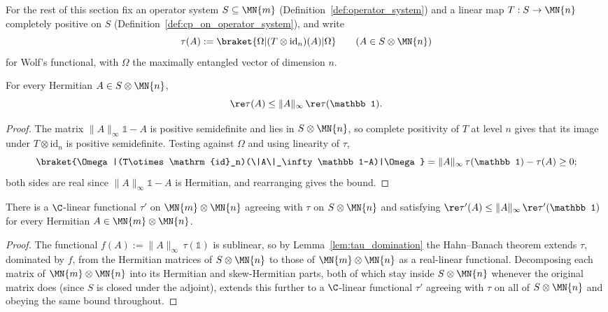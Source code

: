 For the rest of this section fix an operator system $S\subseteq\MN{m}$
(Definition~\ref{def:operator_system}) and a linear map $T:S\to\MN{n}$
completely positive on $S$ (Definition~\ref{def:cp_on_operator_system}),
and write
\[
    \tau(A):=\braket{\Omega|(T\otimes\mathrm{id}_n)(A)|\Omega}
    \qquad(A\in S\otimes\MN{n})
\]
for Wolf's functional, with $\Omega$ the maximally entangled vector of
dimension $n$.

\begin{lemma}
    \label{lem:tau_domination}
    \leanok
    For every Hermitian $A\in S\otimes\MN{n}$,
    \[
        \re\tau(A)\le\|A\|_\infty\,\re\tau(\mathbb 1).
    \]
\end{lemma}

\begin{proof}\leanok
    The matrix $\|A\|_\infty\mathbb1-A$ is positive semidefinite and lies
    in $S\otimes\MN{n}$, so complete positivity of $T$ at level $n$ gives
    that its image under $T\otimes\mathrm{id}_n$ is positive semidefinite.
    Testing against $\Omega$ and using linearity of $\tau$,
    \[
        \braket{\Omega|(T\otimes\mathrm{id}_n)(\|A\|_\infty\mathbb1-A)|\Omega}
        =\|A\|_\infty\,\tau(\mathbb1)-\tau(A)\ge0;
    \]
    both sides are real since $\|A\|_\infty\mathbb1-A$ is Hermitian, and
    rearranging gives the bound.
\end{proof}

\begin{lemma}
    \label{lem:tau_extension}
    \leanok
    There is a $\C$-linear functional $\tau'$ on $\MN{m}\otimes\MN{n}$
    agreeing with $\tau$ on $S\otimes\MN{n}$ and satisfying
    $\re\tau'(A)\le\|A\|_\infty\,\re\tau'(\mathbb1)$ for every Hermitian
    $A\in\MN{m}\otimes\MN{n}$.
\end{lemma}

\begin{proof}\leanok
    The functional $f(A):=\|A\|_\infty\,\tau(\mathbb1)$ is sublinear, so by
    Lemma~\ref{lem:tau_domination} the Hahn--Banach theorem extends $\tau$,
    dominated by $f$, from the Hermitian matrices of $S\otimes\MN{n}$ to
    those of $\MN{m}\otimes\MN{n}$ as a real-linear functional. Decomposing
    each matrix of $\MN{m}\otimes\MN{n}$ into its Hermitian and
    skew-Hermitian parts, both of which stay inside $S\otimes\MN{n}$
    whenever the original matrix does (since $S$ is closed under the
    adjoint), extends this further to a $\C$-linear functional $\tau'$
    agreeing with $\tau$ on all of $S\otimes\MN{n}$ and obeying the same
    bound throughout.
\end{proof}

